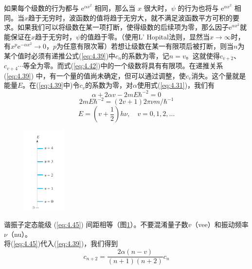     \indent 如果每个级数的行为都与 $\mathrm{e}^{\alpha x^2}$ 相同，那么当 $x$ 很大时，$\psi$ 的行为也将与 $\mathrm{e}^{\alpha x^2}$ 相同。当$x$趋于无穷时，波函数的值将趋于无穷大，就不满足波函数平方可积的要求。如果我们可以将级数在某一项打断，使得级数的后续项为零，那么因子$\mathrm{e}^{\alpha x^2}$就能保证在$x$趋于无穷时，$\psi$的值趋于零。（使用L' Hopital法则，显然当$x \to \infty$时，有$x^p\mathrm{e}^{-\alpha x^2} \to 0$，$p$为任意有限次幂）若想让级数在某一有限项后被打断，则当$n$为某个值时必须有递推公式(\ref{eq:4.39})中$c_n$的系数为零，记$n=v$。这就使得$c_{v+2}$、$c_{v+4}$$\cdots$等全为零。而式(\ref{eq:4.42})中的一个级数将具有有限项。在递推关系 (\ref{eq:4.39}) 中，有一个量的值尚未确定，但可以通过调整，使$c_v$消失。这个量就是能量$E$。在(\ref{eq:4.39}中)令$c_v$的系数为零，对$\alpha$使用式(\ref{eq:4.31})，我们有
    \begin{equation*}
        \alpha + 2\alpha v - 2mE\hbar^{-2} = 0
    \end{equation*}
    \begin{equation*}
        2mE\hbar^{-2} = \left(2v+1\right)2\pi\nu m/\hbar^{-1}
    \end{equation*}
    \begin{equation}
        \boxed{
            E = \left(v+\frac{1}{2}\right)h\nu, \quad v = 0, 1, 2, \ldots
        }
        \label{eq:4.45}
    \end{equation}
    \begin{figure}[h!]
        \centering
        \includegraphics[width=0.2\textwidth]{Figures/4.1.png}
        \caption{}
        \label{fig:4.1}
    \end{figure}
    谐振子定态能级 (\ref{eq:4.45}) 间距相等（图\ref{fig:4.1}）。不要混淆量子数$v$（vee）和振动频率$\nu$（nu）。\\
    \indent 将(\ref{eq:4.45})代入(\ref{eq:4.39})，我们得到
    \begin{equation}
        c_{n+2} = \frac{2\alpha \left(n-v\right)}{(n+1)(n+2)}c_n
        \label{eq:4.46}
    \end{equation}
$$
